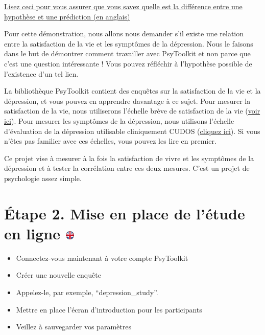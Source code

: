\documentclass[
]{book}
\providecommand{\tightlist}{%
  \setlength{\itemsep}{0pt}\setlength{\parskip}{0pt}}
\begin{document}
\href{http://datanuggets.org/wp-content/uploads/2014/01/Strode_NABT-2011-Hypothesis-Presentation.pdf}{Lisez ceci pour vous assurer que vous savez quelle est la différence entre une hypothèse et une prédiction (en anglais)}

Pour cette démonstration, nous allons nous demander s'il existe une relation entre la satisfaction de la vie et les symptômes de la dépression. Nous le faisons dans le but de démontrer comment travailler avec PsyToolkit et non parce que c'est une question intéressante ! Vous pouvez réfléchir à l'hypothèse possible de l'existence d'un tel lien.

La bibliothèque PsyToolkit contient des enquêtes sur la satisfaction de la vie et la dépression, et vous pouvez en apprendre davantage à ce sujet. Pour mesurer la satisfaction de la vie, nous utiliserons l'échelle brève de satisfaction de la vie (\href{http://www.psytoolkit.org/survey-library/satisfaction-with-life.html}{voir ici}). Pour mesurer les symptômes de la dépression, nous utilisons l'échelle d'évaluation de la dépression utilisable cliniquement CUDOS (\href{http://www.psytoolkit.org/survey-library/depression-cudos.html}{cliquez ici}). Si vous n'êtes pas familier avec ces échelles, vous pouvez les lire en premier.

Ce projet vise à mesurer à la fois la satisfaction de vivre et les symptômes de la dépression et à tester la corrélation entre ces deux mesures. C'est un projet de psychologie assez simple.

\hypertarget{uxe9tape-2.-mise-en-place-de-luxe9tude-en-ligne}{%
\section[Étape 2. Mise en place de l'étude en ligne ]{\texorpdfstring{Étape 2. Mise en place de l'étude en ligne \href{https://www.psytoolkit.org/lessons/questionnaire-project.html\#_step_2_setup_online_study}{\protect\includegraphics{img/ukflag.png}}}{Étape 2. Mise en place de l'étude en ligne }}\label{uxe9tape-2.-mise-en-place-de-luxe9tude-en-ligne}}

\begin{itemize}
\tightlist
\item
  Connectez-vous maintenant à votre compte PsyToolkit
\item
  Créer une nouvelle enquête
\item
  Appelez-le, par exemple, ``depression\_study''.
\item
  Mettre en place l'écran d'introduction pour les participants
\item
  Veillez à sauvegarder vos paramètres
\end{itemize}
\end{document}
